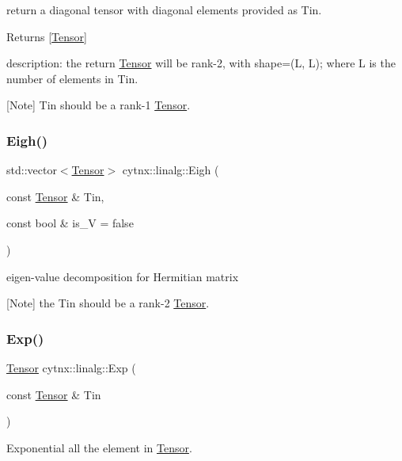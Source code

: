return a diagonal tensor with diagonal elements provided as Tin. 

\begin{DoxyReturn}{Returns}
\mbox{[}\hyperlink{classcytnx_1_1Tensor}{Tensor}\mbox{]}
\end{DoxyReturn}
description\+: the return \hyperlink{classcytnx_1_1Tensor}{Tensor} will be rank-\/2, with shape=(L, L); where L is the number of elements in Tin.

\mbox{[}Note\mbox{]} Tin should be a rank-\/1 \hyperlink{classcytnx_1_1Tensor}{Tensor}. \mbox{\label{namespacecytnx_1_1linalg_aa9f11ed24ef9684fb8d05c228e3852d6}} 
\subsubsection{\texorpdfstring{Eigh()}{Eigh()}}
{\footnotesize\ttfamily std\+::vector$<$\hyperlink{classcytnx_1_1Tensor}{Tensor}$>$ cytnx\+::linalg\+::\+Eigh (\begin{DoxyParamCaption}\item[{const \hyperlink{classcytnx_1_1Tensor}{Tensor} \&}]{Tin,  }\item[{const bool \&}]{is\+\_\+V = {\ttfamily false} }\end{DoxyParamCaption})}



eigen-\/value decomposition for Hermitian matrix 

\mbox{[}Note\mbox{]} the Tin should be a rank-\/2 \hyperlink{classcytnx_1_1Tensor}{Tensor}. \mbox{\label{namespacecytnx_1_1linalg_aac38382cbc0e8202411c96a0ff636471}} 
\subsubsection{\texorpdfstring{Exp()}{Exp()}}
{\footnotesize\ttfamily \hyperlink{classcytnx_1_1Tensor}{Tensor} cytnx\+::linalg\+::\+Exp (\begin{DoxyParamCaption}\item[{const \hyperlink{classcytnx_1_1Tensor}{Tensor} \&}]{Tin }\end{DoxyParamCaption})}



Exponential all the element in \hyperlink{classcytnx_1_1Tensor}{Tensor}. 

